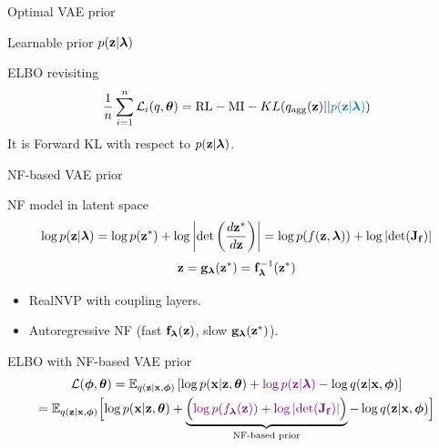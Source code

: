 \begin{frame}{Optimal VAE prior}
\begin{minipage}[t]{0.5\columnwidth}
\begin{block}{Learnable prior $p(\mathbf{z} | \boldsymbol{\lambda})$}
\begin{figure}[h]
			\end{figure}
		\end{block}
	\end{minipage}
	\vspace{-0.4cm}
	\begin{block}{ELBO revisiting}
		\vspace{-0.3cm}
		\[
			\frac{1}{n}\sum_{i=1}^n \mathcal{L}_i(q, \boldsymbol{\theta}) = \text{RL} - \text{MI} -  KL(q_{\text{agg}}(\mathbf{z}) || {\color{teal}p(\mathbf{z} | \boldsymbol{\lambda})})
		\]
		It is Forward KL with respect to $p(\mathbf{z} | \boldsymbol{\lambda})$.
	\end{block}
\end{frame}
\begin{frame}{NF-based VAE prior}
	\begin{block}{NF model in latent space}
		\vspace{-0.5cm}
		\[
			\log p(\mathbf{z} | \boldsymbol{\lambda}) = \log p(\mathbf{z}^*) + \log  \left | \det \left(\frac{d \mathbf{z}^*}{d\mathbf{z}}\right)\right| = \log p(f(\mathbf{z}, \boldsymbol{\lambda})) + \log \left | \det (\mathbf{J}_{\mathbf{f}})\right| 
		\]
		\vspace{-0.3cm}
		\[
			\mathbf{z} = \mathbf{g}_{\boldsymbol{\lambda}}(\mathbf{z}^*) = \mathbf{f}^{-1}_{\boldsymbol{\lambda}}(\mathbf{z}^*)
		\]
	\end{block}
	\vspace{-0.3cm}
	\begin{itemize}
		\item RealNVP with coupling layers.
		\item Autoregressive NF (fast $\mathbf{f}_{\boldsymbol{\lambda}}(\mathbf{z})$, slow $\mathbf{g}_{\boldsymbol{\lambda}}(\mathbf{z}^*)$).
	\end{itemize}
	\begin{block}{ELBO with NF-based VAE prior}
		\vspace{-0.5cm}
		{\small
		\begin{multline*}
			\mathcal{L}(\boldsymbol{\phi}, \boldsymbol{\theta}) = \mathbb{E}_{q(\mathbf{z} | \mathbf{x}, \boldsymbol{\phi})} \left[ \log p(\mathbf{x} | \mathbf{z}, \boldsymbol{\theta}) + {\color{violet}\log p(\mathbf{z} | \boldsymbol{\lambda})} - \log q(\mathbf{z} | \mathbf{x}, \boldsymbol{\phi}) \right] \\
				= \mathbb{E}_{q(\mathbf{z} | \mathbf{x}, \boldsymbol{\phi})} \Bigl[ \log p(\mathbf{x} | \mathbf{z}, \boldsymbol{\theta}) + \underbrace{ \Bigl({\color{violet} \log p(f_{\boldsymbol{\lambda}}(\mathbf{z})) + \log \left| \det (\mathbf{J}_{\mathbf{f}}) \right|} \Bigr) }_{\text{NF-based prior}} - \log q(\mathbf{z} | \mathbf{x}, \boldsymbol{\phi}) \Bigr] 
		\end{multline*}
		}
	\end{block}
\end{frame}
